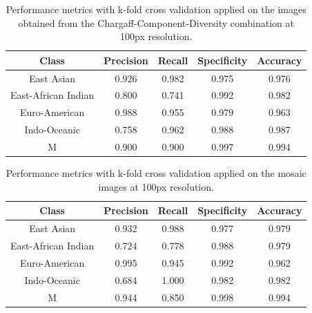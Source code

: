 \begin{table}[H]
	\centering
	\begin{tabular}{|c|c|c|c|c|}
		\hline
		\textbf{Class}      & \textbf{Precision} & \textbf{Recall} & \textbf{Specificity} & \textbf{Accuracy} \\
		\hline
		East Asian          & 0.926              & 0.982           & 0.975                & 0.976             \\
		East-African Indian & 0.800              & 0.741           & 0.992                & 0.982             \\
		Euro-American       & 0.988              & 0.955           & 0.979                & 0.963             \\
		Indo-Oceanic        & 0.758              & 0.962           & 0.988                & 0.987             \\
		M                   & 0.900              & 0.900           & 0.997                & 0.994             \\
		\hline
	\end{tabular}
	\caption{Performance metrics with k-fold cross validation applied on the images obtained from the Chargaff-Component-Diversity
		combination at 100px resolution.}
	\label{tab:kfold_performance_metrics}
\end{table}


\begin{table}[H]
	\centering
	\begin{tabular}{|c|c|c|c|c|}
		\hline
		\textbf{Class}      & \textbf{Precision} & \textbf{Recall} & \textbf{Specificity} & \textbf{Accuracy} \\
		\hline
		East Asian          & 0.932              & 0.988           & 0.977                & 0.979             \\
		East-African Indian & 0.724              & 0.778           & 0.988                & 0.979             \\
		Euro-American       & 0.995              & 0.945           & 0.992                & 0.962             \\
		Indo-Oceanic        & 0.684              & 1.000           & 0.982                & 0.982             \\
		M                   & 0.944              & 0.850           & 0.998                & 0.994             \\
		\hline
	\end{tabular}
	\caption{Performance metrics with k-fold cross validation applied on the mosaic images at 100px resolution.}
	\label{tab:kfold_performance_metrics_mosaic}
\end{table}

